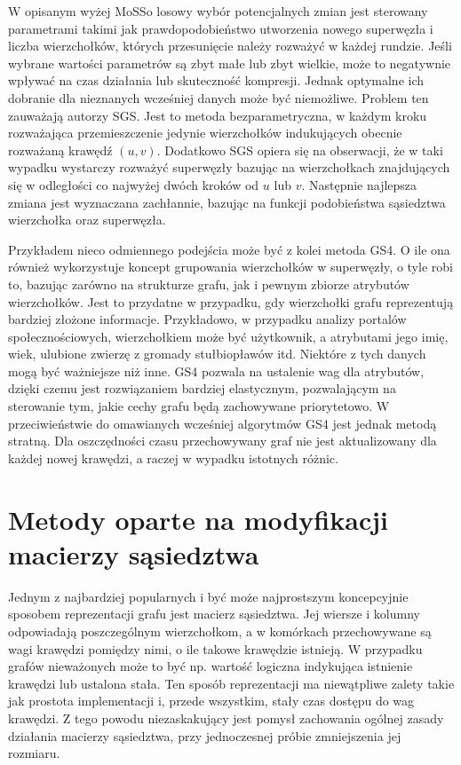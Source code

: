     W opisanym wyżej MoSSo losowy wybór potencjalnych zmian jest sterowany parametrami takimi jak prawdopodobieństwo utworzenia nowego superwęzła i liczba wierzchołków, których przesunięcie należy rozważyć w każdej rundzie. Jeśli wybrane wartości parametrów są zbyt małe lub zbyt wielkie, może to negatywnie wpływać na czas działania lub skuteczność kompresji. Jednak optymalne ich dobranie dla nieznanych wcześniej danych może być niemożliwe. Problem ten zauważają autorzy SGS\cite{Ma_Liu_Yang_Yang_Li_2022}. Jest to metoda bezparametryczna, w każdym kroku rozważająca przemieszczenie jedynie wierzchołków indukujących obecnie rozważaną krawędź $(u,v)$. Dodatkowo SGS opiera się na obserwacji, że w taki wypadku wystarczy rozważyć superwęzły bazując na wierzchołkach znajdujących się w odległości co najwyżej dwóch kroków od $u$ lub $v$. Następnie najlepsza zmiana jest wyznaczana zachłannie, bazując na funkcji podobieństwa sąsiedztwa wierzchołka oraz superwęzła.

    Przykładem nieco odmiennego podejścia może być z kolei metoda GS4\cite{Ashrafi-Payaman_Kangavari_Hosseini_Fander_2020}. O ile ona również wykorzystuje koncept grupowania wierzchołków w superwęzły, o tyle robi to, bazując zarówno na strukturze grafu, jak i pewnym zbiorze atrybutów wierzchołków. Jest to przydatne w przypadku, gdy wierzchołki grafu reprezentują bardziej złożone informacje. Przykładowo, w przypadku analizy portalów społecznościowych, wierzchołkiem może być użytkownik, a atrybutami jego imię, wiek, ulubione zwierzę z gromady stułbiopławów itd. Niektóre z tych danych mogą być ważniejsze niż inne. GS4 pozwala na ustalenie wag dla atrybutów, dzięki czemu jest rozwiązaniem bardziej elastycznym, pozwalającym na sterowanie tym, jakie cechy grafu będą zachowywane priorytetowo. W przeciwieństwie do omawianych wcześniej algorytmów GS4 jest jednak metodą stratną. Dla oszczędności czasu przechowywany graf nie jest aktualizowany dla każdej nowej krawędzi, a raczej w wypadku istotnych różnic.  

\section{Metody oparte na modyfikacji macierzy sąsiedztwa}
    Jednym z najbardziej popularnych i być może najprostszym koncepcyjnie sposobem reprezentacji grafu jest macierz sąsiedztwa. Jej wiersze i kolumny odpowiadają poszczególnym wierzchołkom, a w komórkach przechowywane są wagi krawędzi pomiędzy nimi, o ile takowe krawędzie istnieją. W przypadku grafów nieważonych może to być np. wartość logiczna indykująca istnienie krawędzi lub ustalona stała. Ten sposób reprezentacji ma niewątpliwe zalety takie jak prostota implementacji i, przede wszystkim, stały czas dostępu do wag krawędzi. Z tego powodu niezaskakujący jest pomysł zachowania ogólnej zasady działania macierzy sąsiedztwa, przy jednoczesnej próbie zmniejszenia jej rozmiaru.     

